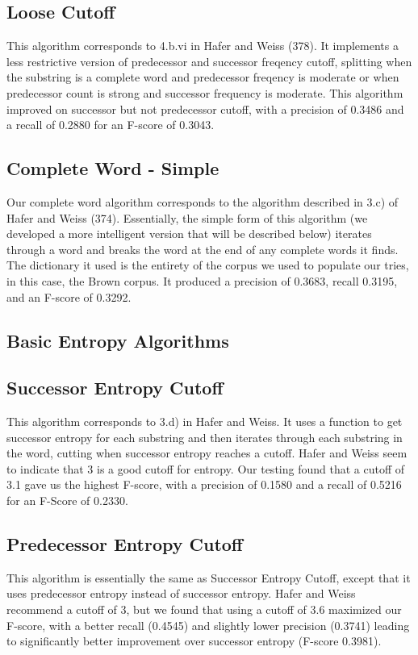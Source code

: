 \documentclass[11pt,letterpaper]{article}
\begin{document}
 
 
\subsection{Loose Cutoff}
  This algorithm corresponds to 4.b.vi in Hafer and Weiss (378). It implements a less restrictive version of predecessor and successor freqency cutoff, splitting when the substring is a complete word and predecessor freqency is moderate or when predecessor count is strong and successor frequency is moderate. This algorithm improved on successor but not predecessor cutoff, with a precision of 0.3486 and a recall of 0.2880 for an F-score of 0.3043. 

\subsection{Complete Word - Simple}
  Our complete word algorithm corresponds to the algorithm described in 3.c) of Hafer and Weiss (374). Essentially, the simple form of this algorithm (we developed a more intelligent version that will be described below) iterates through a word and breaks the word at the end of any complete words it finds. The dictionary it used is the entirety of the corpus we used to populate our tries, in this case, the Brown corpus. It produced a precision of 0.3683, recall 0.3195, and an F-score of 0.3292.
  
  
\subsection{Basic Entropy Algorithms}   


\subsection{Successor Entropy Cutoff}
  This algorithm corresponds to 3.d) in Hafer and Weiss. It uses a function to get successor entropy for each substring and then iterates through each substring in the word, cutting when successor entropy reaches a cutoff. Hafer and Weiss seem to indicate that 3 is a good cutoff for entropy. Our testing found that a cutoff of 3.1 gave us the highest F-score, with a precision of 0.1580 and a recall of 0.5216 for an F-Score of 0.2330.

\subsection{Predecessor Entropy Cutoff}
  This algorithm is essentially the same as Successor Entropy Cutoff, except that it uses predecessor entropy instead of successor entropy. Hafer and Weiss recommend a cutoff of 3, but we found that using a cutoff of 3.6 maximized our F-score, with a better recall (0.4545) and slightly lower precision (0.3741) leading to significantly better improvement over successor entropy (F-score 0.3981).
    
\end{document}
